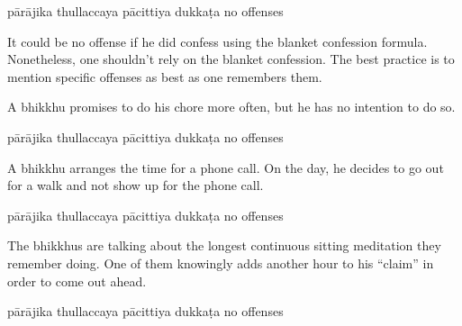 \begin{exam}{\autoExamName}
\begin{problem*}
\begin{parts}
  \bigskip

  \begin{answers}{5}
    \bChoices
     pārājika\eAns
     thullaccaya\eAns
     pācittiya\eAns
     dukkaṭa\eAns
     no offenses\eAns
    \eChoices
  \end{answers}

  \begin{solution}
    It could be no offense if he did confess using the blanket confession
    formula. Nonetheless, one shouldn't rely on the blanket confession. The best
    practice is to mention specific offenses as best as one remembers them.
  \end{solution}

  \bigskip

\item A bhikkhu promises to do his chore more often, but he has no intention to
  do so.

  \bigskip

  \begin{answers}{5}
    \bChoices
     pārājika\eAns
     thullaccaya\eAns
     pācittiya\eAns
     dukkaṭa\eAns
     no offenses\eAns
    \eChoices
  \end{answers}

  \bigskip

\item A bhikkhu arranges the time for a phone call. On the day, he decides to go
  out for a walk and not show up for the phone call.

  \bigskip

  \begin{answers}{5}
    \bChoices
     pārājika\eAns
     thullaccaya\eAns
     pācittiya\eAns
     dukkaṭa\eAns
     no offenses\eAns
    \eChoices
  \end{answers}

  \bigskip

\item The bhikkhus are talking about the longest continuous sitting meditation
  they remember doing. One of them knowingly adds another hour to his ``claim''
  in order to come out ahead.

  \bigskip

  \begin{answers}{5}
    \bChoices
     pārājika\eAns
     thullaccaya\eAns
     pācittiya\eAns
     dukkaṭa\eAns
     no offenses\eAns
    \eChoices
  \end{answers}


\end{parts}
\end{problem*}
\end{exam}
